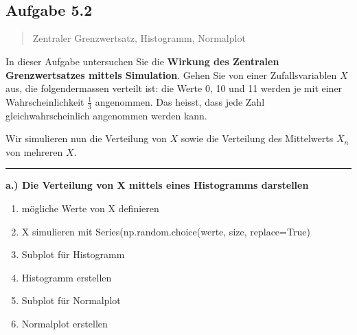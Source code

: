 \documentclass[11pt]{article}
\providecommand{\tightlist}{%
      \setlength{\itemsep}{0pt}\setlength{\parskip}{0pt}}
\begin{document}
    \begin{center}
    \end{center}
    { \hspace*{\fill} \\}
    
    \begin{center}
    \end{center}
    { \hspace*{\fill} \\}
    
    \subsection{Aufgabe 5.2}\label{aufgabe-5.2}

\begin{quote}
Zentraler Grenzwertsatz, Histogramm, Normalplot
\end{quote}

    In dieser Aufgabe untersuchen Sie die \textbf{Wirkung des Zentralen
Grenzwertsatzes mittels Simulation}. Gehen Sie von einer
Zufallsvariablen \(X\) aus, die folgendermassen verteilt ist: die Werte
0, 10 und 11 werden je mit einer Wahrscheinlichkeit \(\frac{1}{3}\)
angenommen. Das heisst, dass jede Zahl gleichwahrscheinlich angenommen
werden kann.

    Wir simulieren nun die Verteilung von \(X\) sowie die Verteilung des
Mittelwerts \(\overline{X}_n\) von mehreren \(X\).

\begin{center}\rule{0.5\linewidth}{\linethickness}\end{center}

\textbf{a.) Die Verteilung von X mittels eines Histogramms darstellen}

\begin{enumerate}
\def\labelenumi{\arabic{enumi}.}
\tightlist
\item
  mögliche Werte von X definieren
\item
  X simulieren mit Series(np.random.choice(werte, size, replace=True)
\item
  Subplot für Histogramm
\item
  Histogramm erstellen
\item
  Subplot für Normalplot
\item
  Normalplot erstellen
\end{enumerate}
\end{document}
